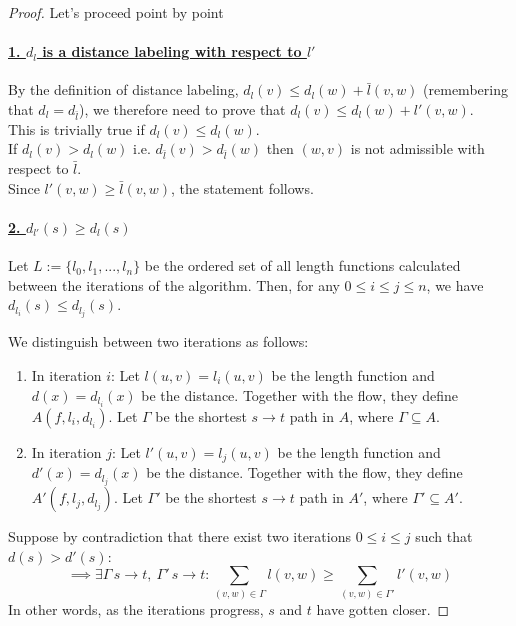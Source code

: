 \begin{proof}
Let's proceed point by point

        \paragraph*{\underline{1. $d_l$ is a distance labeling with respect to $l'$}}
By the definition of distance labeling, $d_l(v) \le d_l(w) + \bar{l}(v,w)$ (remembering that $d_l = d_{\bar{l}}$),
we therefore need to prove that  $d_l(v) \le d_l(w) + l'(v,w)$.\\
This is trivially true if $d_l(v) \le d_l(w)$.\\
If $d_l(v) > d_l(w)$ i.e. $d_{\bar{l}}(v) > d_{\bar{l}}(w)$ then $(w,v)$ is not admissible with respect to $\bar{l}$.\\
Since $l'(v,w)\ge \bar{l}(v,w)$, the statement follows.

        \paragraph*{\underline{2. $d_{l'}(s) \ge d_l(s)$}}

Let \( L:= \{ l_0, l_1, ..., l_n \} \) be the ordered set of all length functions calculated between the iterations of the algorithm. Then, for any \( 0 \le i \le j \le n \), we have \( d_{l_i}(s) \le d_{l_j}(s) \).

We distinguish between two iterations as follows:
        \begin{enumerate}
            \item In iteration \( i \):
Let \( l(u,v) = l_i(u,v) \) be the length function and \( d(x) = d_{l_i}(x) \) be the distance. Together with the flow, they define \( A(f, l_i, d_{l_i}) \). Let \( \Gamma \) be the shortest \( s \rightarrow t \) path in \( A \), where \( \Gamma \subseteq A \).
            \item In iteration \( j \):
Let \( l'(u,v) = l_j(u,v) \) be the length function and \( d'(x) = d_{l_j}(x) \) be the distance. Together with the flow, they define \( A'(f, l_j, d_{l_j}) \). Let \( \Gamma' \) be the shortest \( s \rightarrow t \) path in \( A' \), where \( \Gamma' \subseteq A' \).
        \end{enumerate}
   
Suppose by contradiction that there exist two iterations \( 0 \le i \le j \) such that \( d(s) > d'(s) \):
        \[
        \implies \exists \Gamma \, s \rightarrow t,\ \Gamma' \, s \rightarrow t : \sum_{(v,w) \in \Gamma} l(v,w) \ge \sum_{(v,w) \in \Gamma'} l'(v,w)
        \]
In other words, as the iterations progress, \( s \) and \( t \) have gotten closer.


\end{proof}
